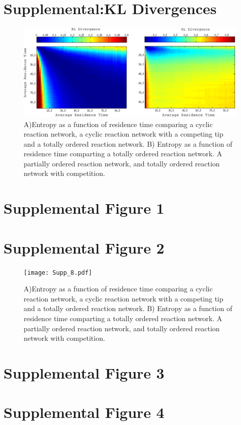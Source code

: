 \documentclass{article}
\begin{document}
\section*{Supplemental:KL Divergences}
\begin{figure}[h]
    \includegraphics[width=\textwidth]{Figure_5.pdf}
	\caption{A)Entropy as a function of residence time comparing a cyclic reaction network, a cyclic reaction network with a competing tip and a totally ordered reaction network. B) Entropy as a function of residence time comparting a totally ordered reaction network. A partially ordered reaction network, and totally ordered reaction network with competition.}
\end{figure}



\section*{Supplemental Figure 1}

\section*{Supplemental Figure 2}

\begin{figure}[h]
    \texttt{[image: Supp\_8.pdf]}
	\caption{A)Entropy as a function of residence time comparing a cyclic reaction network, a cyclic reaction network with a competing tip and a totally ordered reaction network. B) Entropy as a function of residence time comparting a totally ordered reaction network. A partially ordered reaction network, and totally ordered reaction network with competition.}
\end{figure}


\section*{Supplemental Figure 3}

\section*{Supplemental Figure 4}
\end{document}
